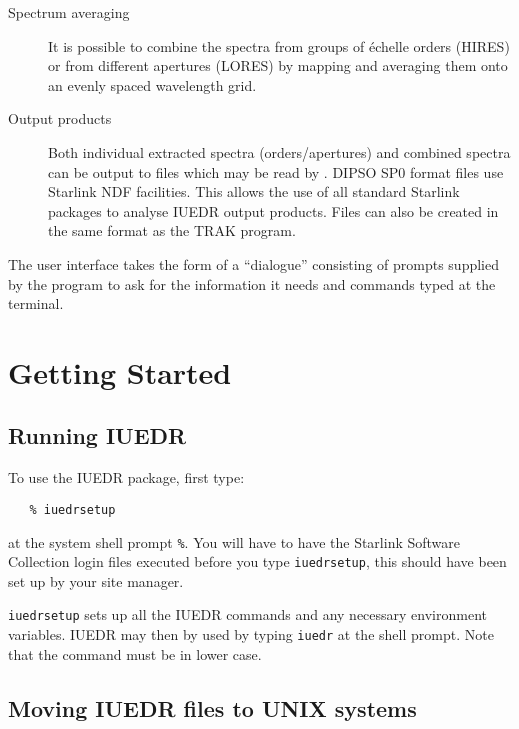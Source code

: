 \begin {description}
\item [Spectrum averaging]
It is possible to combine the spectra from groups of \'{e}chelle orders
(HIRES) or from different apertures (LORES) by mapping and averaging them onto
an evenly spaced wavelength grid.

\item [Output products]
Both individual extracted spectra (orders/apertures) and combined spectra can
be output to files which may be read by .
DIPSO SP0 format files use Starlink NDF facilities.
This allows the use of all standard Starlink packages to analyse IUEDR output
products.
Files can also be created in the same format as the TRAK program.

\end {description}

The user interface takes the form of a ``dialogue'' consisting of
prompts supplied by the program to ask for the information it needs
and  commands typed  at the terminal.

\section {\label{se:getting_started}Getting Started}

\subsection{Running IUEDR}

To use the IUEDR package, first type:

\begin{verbatim}
   % iuedrsetup
\end{verbatim}
at the system shell prompt {\tt \%}.  You will have to have the Starlink
Software Collection login files executed before you type {\tt iuedrsetup},
this should have been set up by your site manager.

{\tt iuedrsetup} sets up all the IUEDR commands and any necessary environment
variables. IUEDR may then by used by typing {\tt iuedr} at the shell prompt.
Note that the command must be in lower case.

\subsection{Moving IUEDR files to UNIX systems} \label{se:iuecnv}

